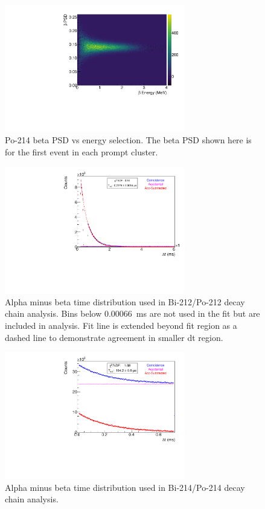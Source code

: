 \begin{figure}[!b]
\centering
\includegraphics[width=0.7\textwidth]{figures/BiPo214BetaPSD.pdf}
\caption{\label{fig:bpsd214}Po-214 beta PSD vs energy selection. The beta PSD shown here is for the first event in each prompt cluster.}
\end{figure}
\begin{figure}[!b]
\centering
\includegraphics[width=0.7\textwidth]{figures/BiPo212DeltaTSpectrum.pdf}
\caption{\label{fig:dt212}Alpha minus beta time distribution used in Bi-212/Po-212 decay chain analysis. Bins below 0.00066~ms are not used in the fit but are included in analysis. Fit line is extended beyond fit region as a dashed line to demonstrate agreement in smaller dt region. }
\end{figure}

\begin{figure}[!bp]
\centering
\includegraphics[width=0.7\textwidth]{figures/BiPo214DeltaTSpectrum.pdf}
\caption{\label{fig:dt214}Alpha minus beta time distribution used in Bi-214/Po-214 decay chain analysis.}
\end{figure}
\newpage
\FloatBarrier

